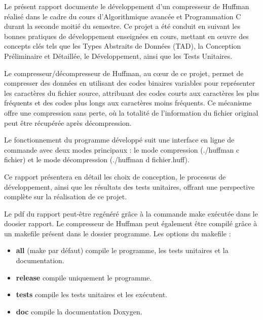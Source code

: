 Le présent rapport documente le développement d'un compresseur de Huffman réalisé dans le cadre du cours d'Algorithmique avancée et Programmation C durant la seconde moitié du semestre. Ce projet a été conduit en suivant les bonnes pratiques de développement enseignées en cours, mettant en œuvre des concepts clés tels que les Types Abstraits de Données (TAD), la Conception Préliminaire et Détaillée, le Développement, ainsi que les Tests Unitaires.

Le compresseur/décompresseur de Huffman, au cœur de ce projet, permet de compresser des données en utilisant des codes binaires variables pour représenter les caractères du fichier source, attribuant des codes courts aux caractères les plus fréquents et des codes plus longs aux caractères moins fréquents. Ce mécanisme offre une compression sans perte, où la totalité de l'information du fichier original peut être récupérée après décompression.

Le fonctionnement du programme développé suit une interface en ligne de commande avec deux modes principaux : le mode compression (./huffman c fichier) et le mode décompression (./huffman d fichier.huff).

Ce rapport présentera en détail les choix de conception, le processus de développement, ainsi que les résultats des tests unitaires, offrant une perspective complète sur la réalisation de ce projet.

\bigbreak

Le pdf du rapport peut-être regénéré grâce à la commande make exécutée dans le doosier rapport. Le compresseur de Huffman peut également être compilé grâce à un makefile présent dans le dossier programme.
Les options du makefile :
\begin{itemize}
	\item \textbf{all} (make par défaut) compile le programme, les tests unitaires et la documentation.
    \item \textbf{release} compile uniquement le programme.
	\item \textbf{tests} compile les tests unitaires et les exécutent.
	\item \textbf{doc} compile la documentation Doxygen.
\end{itemize}